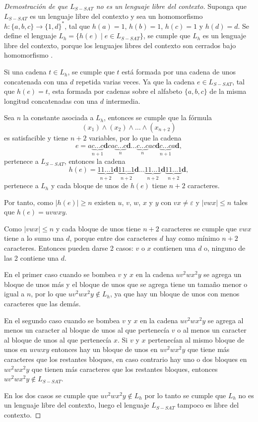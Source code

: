 \begin{proof}[Demostración de que $L_{S-SAT}$ no es un lenguaje libre del contexto]
    Suponga que $L_{S-SAT}$ es un lenguaje libre del contexto y sea un homomorfismo $h: \{a,b,c\}\to \{1,d\}^*$, tal 
    que $h(a)=1$, $h(b)=1$, $h(c)=1$ y $h(d)=d$. Se define el lenguaje $L_h=\{h(e)\mid e\in L_{S-SAT}\}$, se cumple
    que $L_h$ es un lenguaje libre del contexto, porque los lenguajes libres del contexto son cerrados bajo homomorfismo \cite{authomataTheory}.
    
    Si una cadena $t\in L_h$, se cumple que $t$ está formada por una cadena de unos concatenada con una $d$ repetida varias veces. Ya 
    que la cadena $e\in L_{S-SAT}$, tal que $h(e)=t$, esta formada por cadenas sobre el alfabeto $\{a,b,c\}$ de la misma longitud concatenadas
    con una $d$ intermedia.
    
    Sea $n$ la constante asociada a $L_h$, entonces se cumple que la fórmula
    $$(x_1)\wedge(x_2)\wedge\ldots\wedge(x_{n+2})$$ es satisfacible y tiene $n+2$ variables, por lo que la cadena
    $$e=a\underbrace{c\ldots c}_{n+1}\mathbf{d}ca\underbrace{c\ldots c}_{n}\mathbf{d}\ldots \underbrace{c\ldots c}_{n}ac\mathbf{d}\underbrace{c\ldots c}_{n+1}a\mathbf{d},$$
    pertenece a $L_{S-SAT}$, entonces la cadena
    $$h(e)=\underbrace{11\ldots 1}_{n+2}\mathbf{d}\underbrace{11\ldots 1}_{n+2}\mathbf{d}\ldots \underbrace{11\ldots 1}_{n+2}\mathbf{d}\underbrace{11\ldots 1}_{n+2}\mathbf{d},$$
    pertenece a $L_h$ y cada bloque de unos de $h(e)$ tiene $n+2$ caracteres.
    
    Por tanto, como $|h(e)|\geq n$ existen $u$, $v$, $w$, $x$ y $y$ con $vx\neq \varepsilon$ y $|vwx|\leq n$
    tales que $h(e)=uvwxy$.
    
    Como $|vwx|\leq n$ y cada bloque de unos tiene $n+2$ caracteres se cumple que $vwx$ tiene a lo sumo una $d$, porque entre dos caracteres $d$ hay como mínimo $n+2$ caracteres. Entonces pueden darse 2 casos: $v$ o $x$
    contienen una $d$ o, ninguno de las 2 contiene una $d$.
    
    En el primer caso cuando se bombea $v$ y $x$ en la cadena $uv^2wx^2y$ se agrega un bloque de unos más y el bloque de unos
    que se agrega tiene un tamaño menor o igual a $n$, por lo que $uv^2wx^2y\notin L_h$, ya que hay un bloque de unos
    con menos caracteres que las demás.
    
    En el segundo caso cuando se bombea $v$ y $x$ en la cadena $uv^2wx^2y$
    se agrega al menos un caracter al bloque de unos al que pertenecía $v$ o al menos un caracter al bloque de unos al que pertenecía $x$.
    Si $v$ y $x$ pertenecían al mismo bloque de unos en $uvwxy$ entonces hay un bloque de unos en $uv^2wx^2y$ que tiene más caracteres que los restantes bloques,
    en caso contrario hay uno o dos bloques en $uv^2wx^2y$ que tienen más caracteres que los restantes bloques, entonces $uv^2wx^2y\notin L_{S-SAT}$.
    
    En los dos casos se cumple que $uv^2wx^2y\notin L_h$ por lo tanto se cumple que $L_h$ no es un lenguaje libre del contexto, luego 
    el lenguaje $L_{S-SAT}$ tampoco es libre del contexto.
\end{proof}

